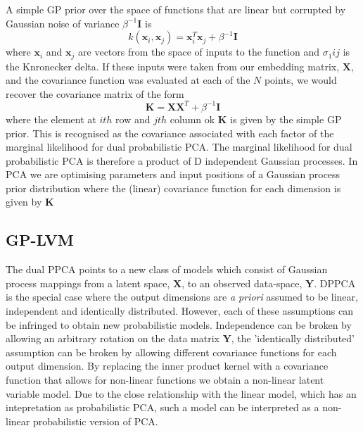 \documentclass[ %
                    author={Dillon Keith Diep},
                supervisor={Dr. Carl Henrik Ek},
                    degree={MEng},
                     title={Assisted Content Generation for 3D Hair Geometry},
                  subtitle={[INCOMPLETE DRAFT, CONTAINS NOTES FROM RESEARCH]},
                      type={Research},
                      year={2014} ]{dissertation}
\begin{document}
A simple GP prior over the space of functions that are linear but corrupted by Gaussian noise of variance $\beta^{-1}\mathbf{I}$ is
\begin{equation}
	k(\mathbf{x}_i,\mathbf{x}_j)=\mathbf{x}^T_i\mathbf{x}_j+\beta^{-1}\mathbf{I}
\end{equation}
where $\mathbf{x}_i$ and $\mathbf{x}_j$ are vectors from the space of inputs to the function and $\sigma_1{ij}$ is the Knronecker delta. If these inputs were taken from our embedding matrix, $\mathbf{X}$, and the covariance function was evaluated at each of the $N$ points, we would recover the covariance matrix of the form
\begin{equation}
	\mathbf{K=XX}^T+\beta^{-1}\mathbf{I}
\end{equation}
where the element at $ith$ row and $jth$ column ok $\mathbf{K}$ is given by the simple GP prior. This is recognised as the covariance associated with each factor of the marginal likelihood for dual probabilistic PCA. The marginal likelihood for dual probabilistic PCA is therefore a product of D independent Gaussian processes. In PCA we are optimising parameters and input positions of a Gaussian process prior distribution where the (linear) covariance function for each dimension is given by $\mathbf{K}$

\subsection{GP-LVM}
The dual PPCA points to a new class of models which consist of Gaussian process mappings from a latent space, $\mathbf{X}$, to an observed data-space, $\mathbf{Y}$. DPPCA is the special case where the output dimensions are \textit{a priori} assumed to be linear, independent and identically distributed. However, each of these assumptions can be infringed to obtain new probabilistic models. Independence can be broken by allowing an arbitrary rotation on the data matrix $\mathbf{Y}$, the 'identically distributed' assumption can be broken by allowing different covariance functions for each output dimension. By replacing the inner product kernel with a covariance function that allows for non-linear functions we obtain a non-linear latent variable model. Due to the close relationship with the linear model, which has an intepretation as probabilistic PCA, such a model can be interpreted as a non-linear probabilistic version of PCA.
\end{document}

